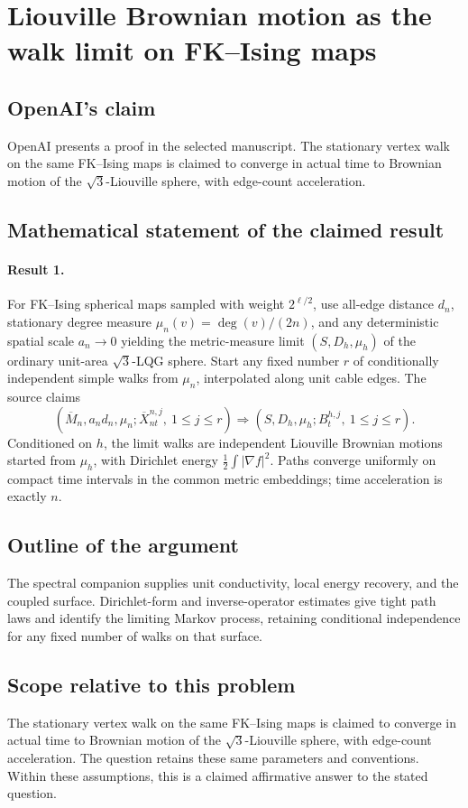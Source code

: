 \documentclass[11pt]{article}
\begin{document}
\section*{Liouville Brownian motion as the walk limit on FK–Ising maps}

\subsection{OpenAI's claim}
OpenAI presents a proof in the selected manuscript. The stationary vertex walk on the same FK--Ising maps is claimed to converge in actual time to Brownian motion of the $\sqrt3$-Liouville sphere, with edge-count acceleration.

\subsection{Mathematical statement of the claimed result}
\paragraph{Result 1.} For FK--Ising spherical maps sampled with weight \(2^{\ell/2}\), use all-edge distance \(d_n\), stationary degree measure \(\mu_n(v)=\deg(v)/(2n)\), and any deterministic spatial scale \(a_n\to0\) yielding the metric-measure limit \((S,D_h,\mu_h)\) of the ordinary unit-area \(\sqrt3\)-LQG sphere. Start any fixed number \(r\) of conditionally independent simple walks from \(\mu_n\), interpolated along unit cable edges. The source claims
\[
 (\overline M_n,a_nd_n,\mu_n;\overline X^{n,j}_{nt},\ 1\le j\le r)
 \Longrightarrow(S,D_h,\mu_h;B_t^{h,j},\ 1\le j\le r).
\]
Conditioned on \(h\), the limit walks are independent Liouville Brownian motions started from \(\mu_h\), with Dirichlet energy \(\tfrac12\int|\nabla f|^2\). Paths converge uniformly on compact time intervals in the common metric embeddings; time acceleration is exactly \(n\).

\subsection{Outline of the argument}
The spectral companion supplies unit conductivity, local energy recovery, and the coupled surface. Dirichlet-form and inverse-operator estimates give tight path laws and identify the limiting Markov process, retaining conditional independence for any fixed number of walks on that surface.

\subsection{Scope relative to this problem}
The stationary vertex walk on the same FK--Ising maps is claimed to converge in actual time to Brownian motion of the $\sqrt3$-Liouville sphere, with edge-count acceleration. The question retains these same parameters and conventions. Within these assumptions, this is a claimed affirmative answer to the stated question.
\end{document}
